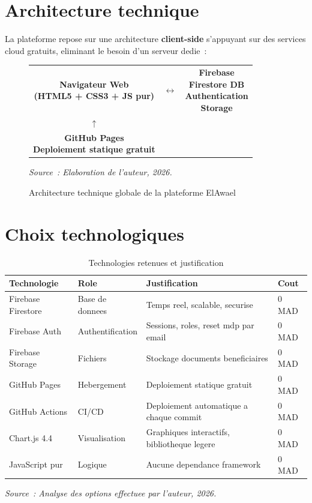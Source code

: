 \documentclass[12pt,a4paper,openany]{report}
\begin{document}
\section{Architecture technique}

La plateforme repose sur une architecture \textbf{client-side} s'appuyant
sur des services cloud gratuits, eliminant le besoin d'un serveur dedie~:

\begin{figure}[H]
\centering
\begin{tcolorbox}[colback=bleuClair!20,colframe=bleu,boxrule=0.8pt,arc=3pt,width=0.9\textwidth]
\centering\small
\begin{tabular}{ccc}
\fbox{\parbox{4cm}{\centering\bfseries Navigateur Web\\(HTML5 + CSS3 + JS pur)}} &
$\longleftrightarrow$ &
\fbox{\parbox{4cm}{\centering\bfseries Firebase\\Firestore DB\\Authentication\\Storage}}\\[0.5cm]
$\uparrow$ & & \\[0.1cm]
\fbox{\parbox{4cm}{\centering\bfseries GitHub Pages\\Deploiement statique gratuit}} & &
\end{tabular}
\end{tcolorbox}
\caption{Architecture technique globale de la plateforme ElAwael}
\label{fig:architecture}
\small\textit{Source~: Elaboration de l'auteur, 2026.}
\end{figure}

\section{Choix technologiques}

\begin{table}[H]
\centering
\caption{Technologies retenues et justification}
\label{tab:techno}
\begin{tabularx}{\textwidth}{llXl}
\toprule
\textbf{Technologie} & \textbf{Role} & \textbf{Justification} & \textbf{Cout}\\
\midrule
Firebase Firestore & Base de donnees & Temps reel, scalable, securise & 0 MAD\\
Firebase Auth & Authentification & Sessions, roles, reset mdp par email & 0 MAD\\
Firebase Storage & Fichiers & Stockage documents beneficiaires & 0 MAD\\
GitHub Pages & Hebergement & Deploiement statique gratuit & 0 MAD\\
GitHub Actions & CI/CD & Deploiement automatique a chaque commit & 0 MAD\\
Chart.js 4.4 & Visualisation & Graphiques interactifs, bibliotheque legere & 0 MAD\\
JavaScript pur & Logique & Aucune dependance framework & 0 MAD\\
\bottomrule
\end{tabularx}
\vspace{0.1cm}
\small\textit{Source~: Analyse des options effectuee par l'auteur, 2026.}
\end{table}
\end{document}
